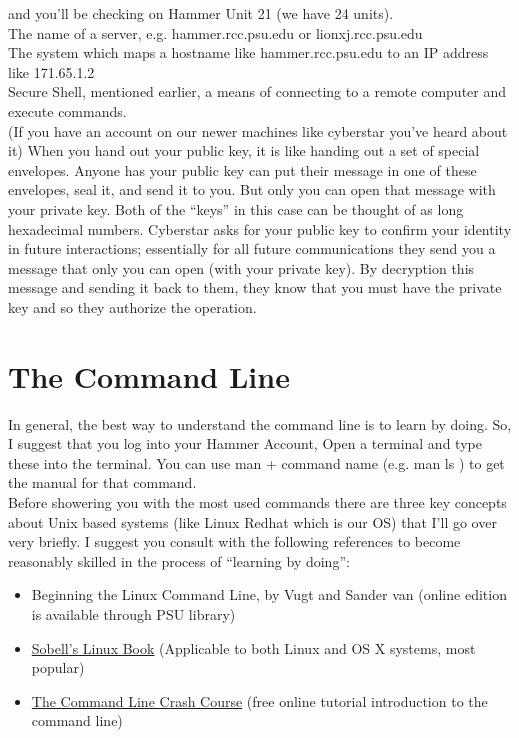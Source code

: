 \documentclass[12pt]{article}
\begin{document}
and you'll be checking on Hammer Unit 21 (we have 24 units).\\
 The name of a server, e.g. hammer.rcc.psu.edu or lionxj.rcc.psu.edu\\
 The system which maps a hostname like hammer.rcc.psu.edu  to an IP address
like 171.65.1.2\\
 Secure Shell, mentioned earlier, a means of connecting to a remote computer and execute commands.\\
 (If you have an account on our newer machines like cyberstar you've heard about it) When you hand out your public key, it is like handing out a set of special
envelopes. Anyone has your public key can put their message in one of these envelopes,
seal it, and send it to you. But only you can open that message with your private key.
Both of the ``keys'' in this case can be thought of as long hexadecimal numbers. Cyberstar 
asks for your public key to confirm your identity in future interactions; essentially for
all future communications they send you a message that only you can open (with your
private key). By decryption this message and sending it back to them, they know that
you must have the private key and so they authorize the operation.



\section{The Command Line}
In general, the best way to understand the command line is to learn by doing. So, I suggest that you log into your Hammer Account, Open a terminal and type these into the terminal. You can use man + command name (e.g. man ls ) to get the manual for that command.\\
Before showering you with the most used commands there are three key concepts about Unix based systems (like Linux Redhat which is our OS) that I'll go over very briefly. I suggest you consult with the following references to become reasonably skilled in the process of ``learning by doing'':\\
\begin{itemize}
\item Beginning the Linux Command Line, by Vugt and Sander van (online edition is available through PSU library)
\item \href{http://www.amazon.com/Practical-Guide-Commands-Editors-Programming/dp/013308504X/ref\%3Dsr_1_1?s\%3Dbooks&ie\%3DUTF8&qid\%3D1358418389&sr\%3D1-1&keywords\%3Dsobell\%2Blinux}{Sobell’s Linux Book} (Applicable to both Linux and OS X systems, most popular)
\item \href{http://cli.learncodethehardway.org/book/}{The Command Line Crash  Course} (free online tutorial introduction to the command line)


\end{itemize}
\end{document}
